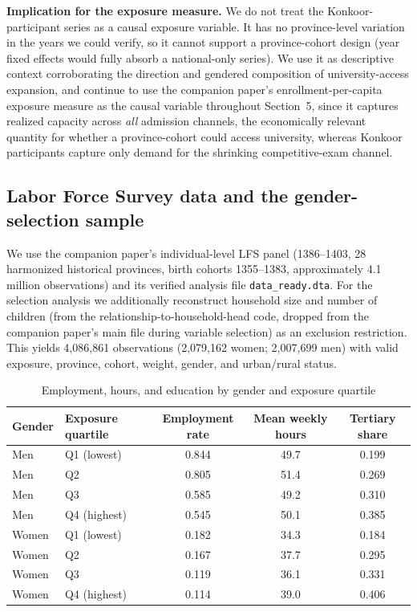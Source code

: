 \documentclass[11pt]{article}
\begin{document}
\textbf{Implication for the exposure measure.} We do not treat the Konkoor-participant series as a causal exposure variable. It has no province-level variation in the years we could verify, so it cannot support a province-cohort design (year fixed effects would fully absorb a national-only series). We use it as descriptive context corroborating the direction and gendered composition of university-access expansion, and continue to use the companion paper's enrollment-per-capita exposure measure as the causal variable throughout Section~5, since it captures realized capacity across \emph{all} admission channels, the economically relevant quantity for whether a province-cohort could access university, whereas Konkoor participants capture only demand for the shrinking competitive-exam channel.

\subsection{Labor Force Survey data and the gender-selection sample}

We use the companion paper's individual-level LFS panel (1386--1403, 28 harmonized historical provinces, birth cohorts 1355--1383, approximately 4.1 million observations) and its verified analysis file \texttt{data\_ready.dta}. For the selection analysis we additionally reconstruct household size and number of children (from the relationship-to-household-head code, dropped from the companion paper's main file during variable selection) as an exclusion restriction. This yields 4{,}086{,}861 observations (2{,}079{,}162 women; 2{,}007{,}699 men) with valid exposure, province, cohort, weight, gender, and urban/rural status.

\begin{table}[htbp]
\centering
\caption{Employment, hours, and education by gender and exposure quartile}
\label{tab:exhibit1}
\begin{tabular}{llccc}
\toprule
Gender & Exposure quartile & Employment rate & Mean weekly hours & Tertiary share \\
\midrule
Men   & Q1 (lowest)  & 0.844 & 49.7 & 0.199 \\
Men   & Q2           & 0.805 & 51.4 & 0.269 \\
Men   & Q3           & 0.585 & 49.2 & 0.310 \\
Men   & Q4 (highest) & 0.545 & 50.1 & 0.385 \\
\addlinespace
Women & Q1 (lowest)  & 0.182 & 34.3 & 0.184 \\
Women & Q2           & 0.167 & 37.7 & 0.295 \\
Women & Q3           & 0.119 & 36.1 & 0.331 \\
Women & Q4 (highest) & 0.114 & 39.0 & 0.406 \\
\bottomrule
\end{tabular}
\end{table}
\end{document}
